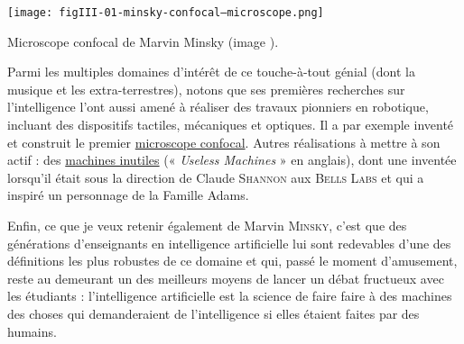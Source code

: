 \vspace{10pt}
\begin{jazzfigure}
\texttt{[image: figIII-01-minsky-confocal--microscope.png]}
\caption{\label{fig:III.1}Microscope confocal de Marvin Minsky (image \href{https://upload.wikimedia.org/wikipedia/commons/4/4b/Minsky_Confocal_Reflection_Microscope.png}{\normalfont\faWikipediaW}).}
\end{jazzfigure}

Parmi les multiples domaines d’intérêt de ce touche-à-tout génial (dont la musique et les extra-terrestres), notons que ses premières recherches sur l’intelligence l’ont aussi amené à réaliser des travaux pionniers en robotique, incluant des dispositifs tactiles, mécaniques et optiques. Il a par exemple inventé et construit le premier \href{https://fr.wikipedia.org/wiki/Microscope_confocal}{microscope confocal}. Autres réalisations à mettre à son actif : des \href{https://fr.wikipedia.org/wiki/Machine_inutile}{machines inutiles} (« \textit{Useless Machines} » en anglais), dont une inventée lorsqu’il était sous la direction de Claude \textsc{Shannon} aux \textsc{Bells Labs} et qui a inspiré un personnage de la Famille Adams.

Enfin, ce que je veux retenir également de Marvin \textsc{Minsky}, c’est que des générations d’enseignants en intelligence artificielle lui sont redevables d’une des définitions les plus robustes de ce domaine et qui, passé le moment d’amusement, reste au demeurant un des meilleurs moyens de lancer un débat fructueux avec les étudiants : l’intelligence artificielle est la science de faire faire à des machines des choses qui demanderaient de l’intelligence si elles étaient faites par des humains.

\vspace{4pt}

